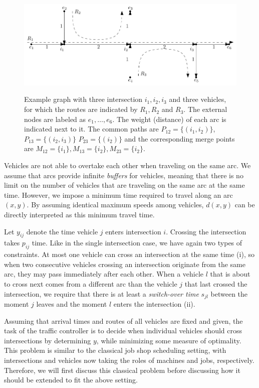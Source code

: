 \documentclass{article}
\theoremstyle{definition}
\theoremstyle{plain}
\begin{document}
\begin{figure}[t]
  \centering
  \includegraphics[width=1.0\textwidth]{figures/intersection-graph-example.pdf}
  \label{fig:intersection-graph-example}
  \caption{Example graph with three intersection $i_{1}, i_{2}, i_{3}$ and three
    vehicles, for which the routes are indicated by $R_{1}, R_{2}$ and $R_{3}$.
    The external nodes are labeled as $e_{1}, \dots, e_{6}$. The weight
    (distance) of each arc is indicated next to it. The common paths are
    $P_{12} = \{ (i_{1}, i_{2}) \}$, $P_{13} = \{ (i_{2}, i_{3}) \}$
    $P_{23} = \{ (i_{2}) \}$ and the corresponding merge points are
    $M_{12} = \{ i_{1} \}, M_{13} = \{ i_{2} \}, M_{23} = \{ i_{2} \}$.}
\end{figure}

Vehicles are not able to overtake each other when traveling on the same arc. We
assume that arcs provide infinite \textit{buffers} for vehicles, meaning that
there is no limit on the number of vehicles that are traveling on the same arc
at the same time. However, we impose a minimum time required to travel along an
arc $(x,y)$. By assuming identical maximum speeds among vehicles, $d(x,y)$ can
be directly interpreted as this minimum travel time.

Let $y_{ij}$ denote the time vehicle $j$ enters intersection $i$. Crossing the
intersection takes $p_{ij}$ time. Like in the single intersection case, we have
again two types of constraints. At most one vehicle can cross an intersection at
the same time (i), so when two consecutive vehicles crossing an intersection
originate from the same arc, they may pass immediately after each other. When a
vehicle $l$ that is about to cross next comes from a different arc than the
vehicle $j$ that last crossed the intersection, we require that there is at
least a \textit{switch-over time} $s_{jl}$ between the moment $j$ leaves and the
moment $l$ enters the intersection (ii).

Assuming that arrival times and routes of all vehicles are fixed and given, the
task of the traffic controller is to decide when individual vehicles should
cross intersections by determining $y$, while minimizing some measure of
optimality. This problem is similar to the classical job shop scheduling
setting, with intersections and vehicles now taking the roles of machines and
jobs, respectively. Therefore, we will first discuss this classical problem
before discussing how it should be extended to fit the above setting.
\end{document}
